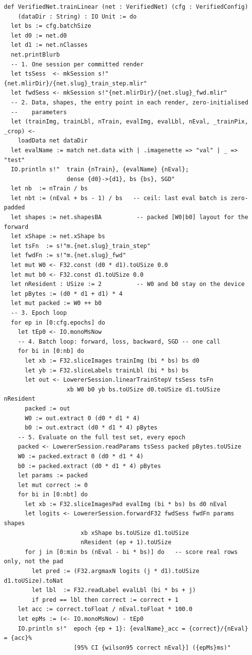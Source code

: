 \begin{verbatim}
def VerifiedNet.trainLinear (net : VerifiedNet) (cfg : VerifiedConfig)
    (dataDir : String) : IO Unit := do
  let bs := cfg.batchSize
  let d0 := net.d0
  let d1 := net.nClasses
  net.printBlurb
  -- 1. One session per committed render
  let tsSess  <- mkSession s!"{net.mlirDir}/{net.slug}_train_step.mlir"
  let fwdSess <- mkSession s!"{net.mlirDir}/{net.slug}_fwd.mlir"
  -- 2. Data, shapes, the entry point in each render, zero-initialised
  --    parameters
  let (trainImg, trainLbl, nTrain, evalImg, evalLbl, nEval, _trainPix, _crop) <-
    loadData net dataDir
  let evalName := match net.data with | .imagenette => "val" | _ => "test"
  IO.println s!"  train {nTrain}, {evalName} {nEval};
                  dense {d0}->{d1}, bs {bs}, SGD"
  let nb  := nTrain / bs
  let nbt := (nEval + bs - 1) / bs   -- ceil: last eval batch is zero-padded
  let shapes := net.shapesBA          -- packed [W0|b0] layout for the forward
  let xShape := net.xShape bs
  let tsFn  := s!"m.{net.slug}_train_step"
  let fwdFn := s!"m.{net.slug}_fwd"
  let mut W0 <- F32.const (d0 * d1).toUSize 0.0
  let mut b0 <- F32.const d1.toUSize 0.0
  let nResident : USize := 2          -- W0 and b0 stay on the device
  let pBytes := (d0 * d1 + d1) * 4
  let mut packed := W0 ++ b0
  -- 3. Epoch loop
  for ep in [0:cfg.epochs] do
    let tEp0 <- IO.monoMsNow
    -- 4. Batch loop: forward, loss, backward, SGD -- one call
    for bi in [0:nb] do
      let xb := F32.sliceImages trainImg (bi * bs) bs d0
      let yb := F32.sliceLabels trainLbl (bi * bs) bs
      let out <- LowererSession.linearTrainStepV tsSess tsFn
                  xb W0 b0 yb bs.toUSize d0.toUSize d1.toUSize nResident
      packed := out
      W0 := out.extract 0 (d0 * d1 * 4)
      b0 := out.extract (d0 * d1 * 4) pBytes
    -- 5. Evaluate on the full test set, every epoch
    packed <- LowererSession.readParams tsSess packed pBytes.toUSize
    W0 := packed.extract 0 (d0 * d1 * 4)
    b0 := packed.extract (d0 * d1 * 4) pBytes
    let params := packed
    let mut correct := 0
    for bi in [0:nbt] do
      let xb := F32.sliceImagesPad evalImg (bi * bs) bs d0 nEval
      let logits <- LowererSession.forwardF32 fwdSess fwdFn params shapes
                      xb xShape bs.toUSize d1.toUSize
                      nResident (ep + 1).toUSize
      for j in [0:min bs (nEval - bi * bs)] do   -- score real rows only, not the pad
        let pred := (F32.argmaxN logits (j * d1).toUSize d1.toUSize).toNat
        let lbl  := F32.readLabel evalLbl (bi * bs + j)
        if pred == lbl then correct := correct + 1
    let acc := correct.toFloat / nEval.toFloat * 100.0
    let epMs := (<- IO.monoMsNow) - tEp0
    IO.println s!"  epoch {ep + 1}: {evalName}_acc = {correct}/{nEval} = {acc}%
                    [95% CI {wilson95 correct nEval}] ({epMs}ms)"
\end{verbatim}

